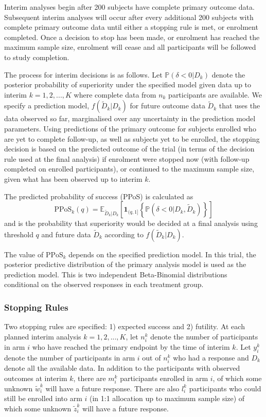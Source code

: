 \documentclass{bmcart}
\begin{document}
Interim analyses begin after 200 subjects have complete primary outcome data.
Subsequent interim analyses will occur after every additional 200 subjects with complete primary outcome data until either a stopping rule is met, or enrolment completed.
Once a decision to stop has been made, or enrolment has reached the maximum sample size, enrolment will cease and all participants will be followed to study completion.

The process for interim decisions is as follows.
Let $\mathbb P(\delta < 0|D_k)$ denote the posterior probability of superiority under the specified model given data up to interim $k=1,2,...,K$ where complete data from $n_k$ participants are available.
We specify a prediction model, $f(\tilde D_k|D_k)$ for future outcome data $\tilde D_k$ that uses the data observed so far, marginalised over any uncertainty in the prediction model parameters.
Using predictions of the primary outcome for subjects enrolled who are yet to complete follow-up, as well as subjects yet to be enrolled, the stopping decision is based on the predicted outcome of the trial (in terms of the decision rule used at the final analysis) if enrolment were stopped now (with follow-up completed on enrolled participants), or continued to the maximum sample size, given what has been observed up to interim $k$.

The predicted probability of success (PPoS) \cite{berry2010bayesian} is calculated as
$$
\text{PPoS}_k(q) = \mathbb E_{\tilde D_k | D_k}\left[\textbf{1}_{(q,1]}\left\{\mathbb P(\delta<0|D_k,\tilde D_k)\right\}\right]
$$
and is the probability that superiority would be decided at a final analysis using threshold $q$ and future data $\tilde D_k$ according to $f(\tilde D_k|D_k)$.

The value of \(\text{PPoS}_k\) depends on the specified prediction model.
In this trial, the posterior predictive distribution of the primary analysis model is used as the prediction model.
This is two independent Beta-Binomial distributions conditional on the observed responses in each treatment group.

\subsubsection*{Stopping Rules}

Two stopping rules are specified: 1) expected success and 2) futility.
At each planned interim analysis $k=1,2,...,K$, let $n_i^k$ denote the number of participants in arm $i$ who have reached the primary endpoint by the time of interim $k$.
Let $y_i^k$ denote the number of participants in arm $i$ out of $n_i^k$ who had a response and $D_k$ denote all the available data.
In addition to the participants with observed outcomes at interim $k$, there are $m_i^k$ participants enrolled in arm $i$, of which some unknown $\tilde w_i^k$ will have a future response. There are also $l_i^k$ participants who could still be enrolled into arm $i$ (in 1:1 allocation up to maximum sample size) of which some unknown $\tilde z_i^k$ will have a future response.
\end{document}
